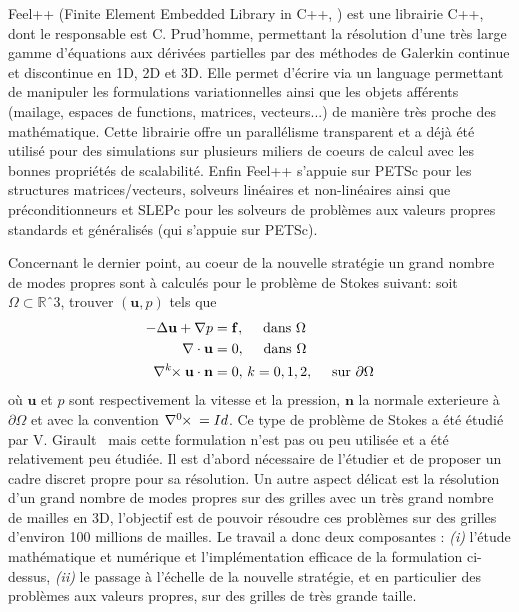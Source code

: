 \documentclass[12pt]{article}
\newcommand{\curlk}[1][k]{\ensuremath{\nabla^{#1}\hspace{-.3em}\times}\xspace}
\begin{document}
Feel++ (Finite Element Embedded Library in C++,
\cite{PRUDHOMME:2012:HAL-00662868:3,feelpp098:10046} ) est une librairie C++,
dont le responsable est C. Prud'homme, permettant la résolution d'une très large
gamme d'équations aux dérivées partielles par des méthodes de Galerkin continue
et discontinue en 1D, 2D et 3D. Elle permet d'écrire via un language permettant
de manipuler les formulations variationnelles ainsi que les objets afférents
(mailage, espaces de functions, matrices, vecteurs...) de manière très proche
des mathématique. Cette librairie offre un parallélisme transparent et a déjà
été utilisé pour des simulations sur plusieurs miliers de coeurs de calcul avec
les bonnes propriétés de scalabilité. Enfin Feel++ s'appuie sur PETSc pour les
structures matrices/vecteurs, solveurs linéaires et non-linéaires ainsi que
préconditionneurs et SLEPc pour les solveurs de problèmes aux valeurs propres
standards et généralisés (qui s'appuie sur PETSc).

Concernant le dernier point, au coeur de la nouvelle stratégie un grand nombre
de modes propres sont à calculés pour le problème de Stokes suivant: soit
$\Omega \subset \mathbb{R}ˆ3$, trouver $(\mathbf{u},p)$ tels que
\begin{align}
  \label{eq:1}
  -\Delta \mathbf{u} + \nabla p &= \mathbf{f},\quad \mbox{ dans } \Omega\\
  \nabla \cdot \mathbf{u} &= 0,\quad \mbox{ dans } \Omega\\
  \curlk{} \mathbf{u} \cdot \mathbf{n} &= 0,\, k=0,1,2,\quad \mbox{ sur
  } \partial \Omega
\end{align}
où $\mathbf{u}$ et $p$ sont respectivement la vitesse et la pression,
$\mathbf{n}$ la normale exterieure à $\partial \Omega$ et avec la convention
$\curlk[0]{} = Id$. Ce type de problème de Stokes a été étudié par
V. Girault~\cite{girault90-1} mais cette formulation n'est pas ou peu utilisée
et a été relativement peu étudiée. Il est d'abord nécessaire de l'étudier et de
proposer un cadre discret propre pour sa résolution. Un autre aspect délicat est
la résolution d'un grand nombre de modes propres sur des grilles avec un très
grand nombre de mailles en 3D, l'objectif est de pouvoir résoudre ces problèmes
sur des grilles d'environ 100 millions de mailles.  Le travail a donc deux
composantes : \textit{(i)} l'étude mathématique et numérique et l'implémentation
efficace de la formulation ci-dessus, \textit{(ii)} le passage à l'échelle de la
nouvelle stratégie, et en particulier des problèmes aux valeurs propres, sur des
grilles de très grande taille.
\end{document}
